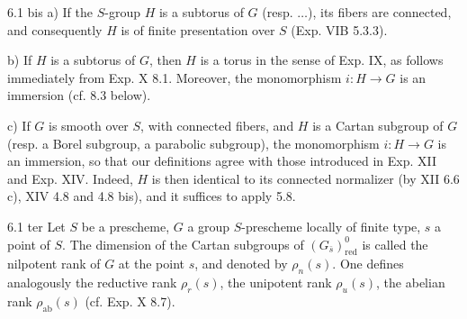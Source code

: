 \begin{remarks}{6.1 bis}\label{XV.6.1bis}
a) If the $S$-group $H$ is a subtorus of $G$ (resp. $\ldots$), its fibers are connected, and consequently $H$ is of finite presentation over $S$ (Exp. VIB 5.3.3).

b) If $H$ is a subtorus of $G$, then $H$ is a torus in the sense of Exp. IX, as follows immediately from Exp. X 8.1. Moreover, the monomorphism $i:H\to G$ is an immersion (cf. 8.3 below).

c) If $G$ is smooth over $S$, with connected fibers, and $H$ is a Cartan subgroup of $G$ (resp. a Borel subgroup, a parabolic subgroup), the monomorphism $i:H\to G$ is an immersion, so that our definitions agree with those introduced in Exp. XII and Exp. XIV. Indeed, $H$ is then identical to its connected normalizer (by XII 6.6 c), XIV 4.8 and 4.8 bis), and it suffices to apply 5.8.
\end{remarks}
\begin{definition}{6.1 ter}\label{XV.6.1ter}
Let $S$ be a prescheme, $G$ a group $S$-prescheme locally of finite type, $s$ a point of $S$. The dimension of the Cartan subgroups of $(G_{\bar s})^0_{\mathrm{red}}$ is called the nilpotent rank of $G$ at the point $s$, and denoted by $\rho_n(s)$. One defines analogously the reductive rank $\rho_r(s)$, the unipotent rank $\rho_u(s)$, the abelian rank $\rho_{\mathrm{ab}}(s)$ (cf. Exp. X 8.7).
\end{definition}


